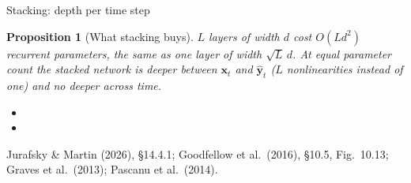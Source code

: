 \documentclass[aspectratio=169, 11pt]{beamer}
\newtheorem{propx}[theorem]{Proposition}
\newcommand{\srcline}[1]{%
  \par\vspace{0.25em}%
  {\scriptsize\color{mcMuted}\hfill #1\par}}
\newcommand{\src}[3]{}      %
\begin{document}
\begin{frame}{Stacking: depth per time step}
  \src{jurafsky_slp3}{section}{14.4.1}
  \src{goodfellow2016}{section}{10.5}
  \src{graves2013b}{equation}{11-12}
  \src{pascanu2014}{section}{3.2.4}
  \vspace{-0.45em}
  \begin{propx}[What stacking buys]\label{th:stack}
    \small
    $L$ layers of width $d$ cost $O(L d^2)$ recurrent parameters, the
    same as one layer of width $\sqrt{L}\,d$. At equal parameter count
    the stacked network is deeper between $\mathbf{x}_t$ and $\hat{\mathbf{y}}_t$
    ($L$ nonlinearities instead of one) and no deeper across time.
  \end{propx}
  \vspace{-0.1em}
  {\footnotesize
  \begin{itemize}\itemsep0.12em
    \item {}
    \item {}
  \end{itemize}}
  \vspace{-0.3em}
  \srcline{Jurafsky \& Martin (2026), \S14.4.1; Goodfellow et al.\ (2016), \S10.5, Fig.~10.13; Graves et al.\ (2013); Pascanu et al.\ (2014).}
\end{frame}
\end{document}
